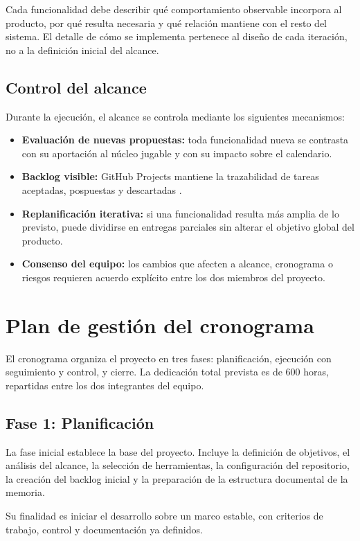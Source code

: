 Cada funcionalidad debe describir qué comportamiento observable incorpora al producto, por
qué resulta necesaria y qué relación mantiene con el resto del sistema. El detalle de cómo se
implementa pertenece al diseño de cada iteración, no a la definición inicial del alcance.

\subsection{Control del alcance}
Durante la ejecución, el alcance se controla mediante los siguientes mecanismos:

\begin{itemize}
    \item \textbf{Evaluación de nuevas propuestas:} toda funcionalidad nueva se contrasta
    con su aportación al núcleo jugable y con su impacto sobre el calendario.
    \item \textbf{Backlog visible:} GitHub Projects mantiene la trazabilidad de tareas
    aceptadas, pospuestas y descartadas \cite{githubIssuesProjects}.
    \item \textbf{Replanificación iterativa:} si una funcionalidad resulta más amplia de lo
    previsto, puede dividirse en entregas parciales sin alterar el objetivo global del
    producto.
    \item \textbf{Consenso del equipo:} los cambios que afecten a alcance, cronograma o
    riesgos requieren acuerdo explícito entre los dos miembros del proyecto.
\end{itemize}

\section{Plan de gestión del cronograma}
El cronograma organiza el proyecto en tres fases: planificación, ejecución con seguimiento y
control, y cierre. La dedicación total prevista es de 600 horas, repartidas entre los dos
integrantes del equipo.

\subsection{Fase 1: Planificación}
La fase inicial establece la base del proyecto. Incluye la definición de objetivos, el
análisis del alcance, la selección de herramientas, la configuración del repositorio, la
creación del backlog inicial y la preparación de la estructura documental de la memoria.

Su finalidad es iniciar el desarrollo sobre un marco estable, con criterios de trabajo,
control y documentación ya definidos.

